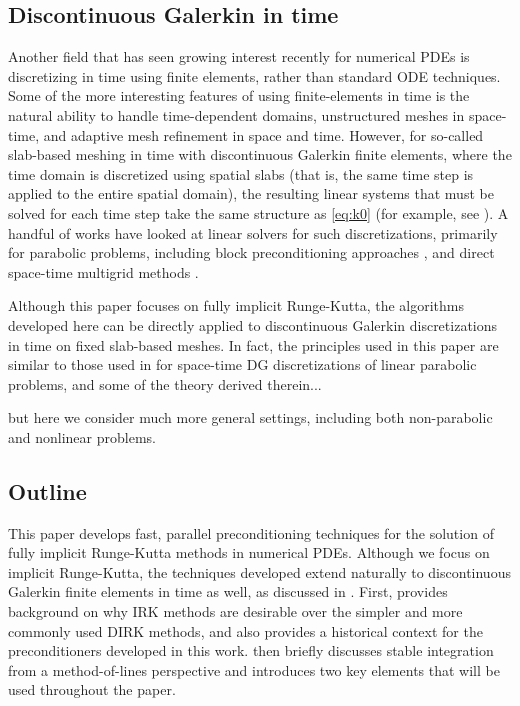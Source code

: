 \documentclass[review]{siamart}
\begin{document}
\subsection{Discontinuous Galerkin in time}\label{sec:intro:dg}

Another field that has seen growing interest recently for numerical PDEs is discretizing
in time using finite elements, rather than standard ODE techniques. Some of the more
interesting features of using finite-elements in time is the natural ability to handle
time-dependent domains, unstructured meshes in space-time, and adaptive mesh
refinement in space and time. However, for so-called slab-based meshing in time with
discontinuous Galerkin finite elements, where
the time domain is discretized using spatial slabs (that is, the same time step is
applied to the entire spatial domain), the resulting linear systems that must be
solved for each time step take the same structure as \eqref{eq:k0} (for example,
see \cite{hn}). A handful of works have looked at linear solvers for such
discretizations, primarily for parabolic problems, including block preconditioning
approaches \cite{exh,8jp,27n}, and direct space-time multigrid methods 
\cite{gander2016analysis}.

Although this paper focuses on fully implicit Runge-Kutta, the algorithms developed
here can be directly applied to discontinuous Galerkin discretizations in time on
fixed slab-based meshes. In fact, the principles used in this paper are similar
to those used in \cite{exh} for space-time DG discretizations of linear parabolic
problems, and some of the theory derived therein...

but here we consider much more general settings, including both
non-parabolic and nonlinear problems.

\subsection{Outline}\label{sec:intro:outline}

This paper develops fast, parallel preconditioning techniques for the solution of
fully implicit Runge-Kutta methods in numerical PDEs. Although we focus on implicit
Runge-Kutta, the techniques developed extend naturally to discontinuous Galerkin 
finite elements in time as well, as discussed in . 
First,  provides background on why IRK methods are desirable
over the simpler and more commonly used DIRK methods, and also provides a
historical context for the preconditioners developed in this work.
 then briefly discusses stable integration from
a method-of-lines perspective and introduces two key elements that will be
used throughout the paper. 
\end{document}
